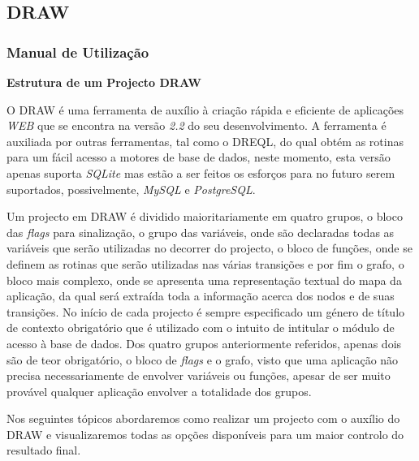 \documentclass[a4paper]{article}
\begin{document}
\subsection{\large DRAW}

\bigskip
\subsubsection{\large Manual de Utilização}
\bigskip
\begin{large}
\textbf{Estrutura de um Projecto DRAW}\\
\end{large}

\hspace{1cm}O DRAW é uma ferramenta de auxílio à criação rápida e eficiente de aplicações \emph{WEB} que se encontra na versão \emph{2.2}
do seu desenvolvimento. A ferramenta é auxiliada por outras ferramentas, tal como o DREQL, do qual obtém as rotinas para um fácil acesso
a motores de base de dados, neste momento, esta versão apenas suporta \emph{SQLite} mas estão a ser feitos os esforços para no futuro
serem suportados, possivelmente, \emph{MySQL} e \emph{PostgreSQL}.

\hspace{1cm}Um projecto em DRAW é dividido maioritariamente em quatro grupos, o bloco das \emph{flags} para sinalização, o grupo das
variáveis, onde são declaradas todas as variáveis que serão utilizadas no decorrer do projecto, o bloco de funções, onde se definem as
rotinas que serão utilizadas nas várias transições e por fim o grafo, o bloco mais complexo, onde se apresenta uma representação textual
do mapa da aplicação, da qual será extraída toda a informação acerca dos nodos e de suas transições. No início de cada projecto é sempre
especificado um género de título de contexto obrigatório que é utilizado com o intuito de intitular o módulo de acesso à base de dados.
Dos quatro grupos anteriormente referidos, apenas dois são de teor obrigatório, o bloco de \emph{flags} e o grafo, visto que uma
aplicação não precisa necessariamente de envolver variáveis ou funções, apesar de ser muito provável qualquer aplicação envolver a
totalidade dos grupos.

\hspace{1cm}Nos seguintes tópicos abordaremos como realizar um projecto com o auxílio do DRAW e visualizaremos todas as opções
disponíveis para um maior controlo do resultado final.\\\\
\end{document}
